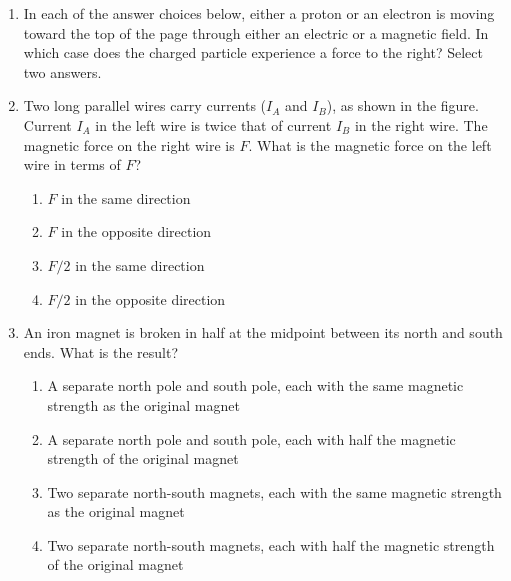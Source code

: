 \documentclass{../../oss-apphys}
\begin{document}
\begin{multicols}{2}
\begin{enumerate}[leftmargin=18pt]
    \columnbreak

  \item In each of the answer choices below, either a proton or an electron is
    moving toward the top of the page through either an electric or a
    magnetic field. In which case does the charged particle experience a
    force to the right? Select two answers.


  \item Two long parallel wires carry currents ($I_A$ and $I_B$), as shown in
    the figure. Current $I_A$ in the left wire is twice that of current $I_B$
    in the right wire. The magnetic force on the right wire is $F$. What is the
    magnetic force on the left wire in terms of $F$?
    \begin{center}
    \end{center}
    \begin{enumerate}[noitemsep,topsep=0pt,leftmargin=18pt,label=(\Alph*)]
    \item $F$ in the same direction
    \item $F$ in the opposite direction
    \item $F/2$ in the same direction
    \item $F/2$ in the opposite direction
    \end{enumerate}


  \item An iron magnet is broken in half at the midpoint between its north
    and south ends. What is the result?
    \begin{enumerate}[noitemsep,topsep=0pt,leftmargin=18pt,label=(\Alph*)]
    \item A separate north pole and south pole, each with the same magnetic
      strength as the original magnet
    \item A separate north pole and south pole, each with half the magnetic
      strength of the original magnet
    \item Two separate north-south magnets, each with the same magnetic strength
      as the original magnet
    \item Two separate north-south magnets, each with half the magnetic strength
      of the original magnet
    \end{enumerate}


\end{enumerate}
\end{multicols}
\end{document}
